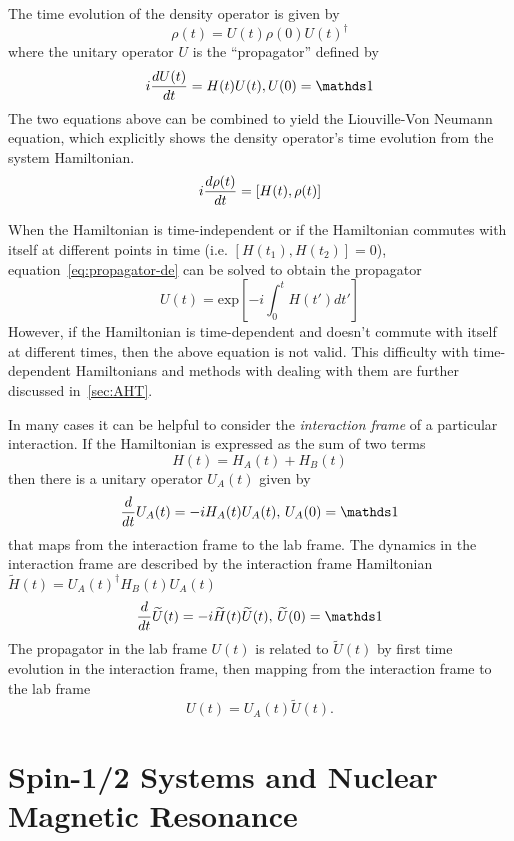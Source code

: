 The time evolution of the density operator is given by
\begin{equation}\label{eq:density-time}
    \rho(t) = U(t) \rho(0) U(t)^\dagger
\end{equation}
where the unitary operator $U$ is the ``propagator'' defined by
\begin{equation}\label{eq:propagator-de}
    i \ddt{U(t)} = H(t) U(t), U(0) = \identity
\end{equation}
The two equations above can be combined to yield the Liouville-Von Neumann equation, which explicitly shows the density operator's time evolution from the system Hamiltonian.
\begin{equation}
    i \frac{d \rho(t)}{dt} = [H(t), \rho(t)]
\end{equation}

When the Hamiltonian is time-independent or if the Hamiltonian commutes with itself at different points in time (i.e. $[H(t_1), H(t_2)] = 0$), equation~\ref{eq:propagator-de} can be solved to obtain the propagator
\[
U(t) = \text{exp}\left[ {-i \int_0^t H(t') dt'} \right]
\]
However, if the Hamiltonian is time-dependent and doesn't commute with itself at different times, then the above equation is not valid. This difficulty with time-dependent Hamiltonians and methods with dealing with them are further discussed in~\ref{sec:AHT}.

In many cases it can be helpful to consider the \emph{interaction frame} of a particular interaction. If the Hamiltonian is expressed as the sum of two terms
\[
H(t) = H_A(t) + H_B(t)
\]
then there is a unitary operator $U_A(t)$ given by
\begin{equation}\label{eq:interaction-propagator}
    \frac{d}{dt} U_A(t) = -i H_A(t) U_A(t), \, U_A(0) = \identity
\end{equation}
that maps from the interaction frame to the lab frame.
The dynamics in the interaction frame are described by the interaction frame Hamiltonian $\widetilde{H}(t) = {U_A(t)}^{\dagger} H_B(t)U_A(t)$
\[
\frac{d}{dt}\widetilde{U}(t) = -i \widetilde{H}(t)\widetilde{U}(t),\, \widetilde{U}(0) = \identity
\]
The propagator in the lab frame $U(t)$ is related to $\widetilde{U}(t)$ by first time evolution in the interaction frame, then mapping from the interaction frame to the lab frame
\[
U(t) = U_A(t)\widetilde{U}(t).
\]

\section{Spin-1/2 Systems and Nuclear Magnetic Resonance}

